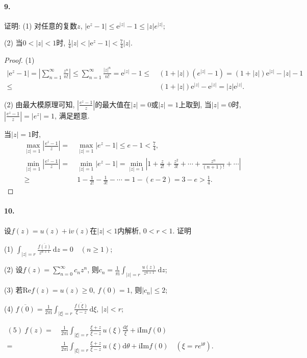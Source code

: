 \documentclass[12pt, a4paper, oneside]{ctexart}
\let\leq=\leqslant %
\let\geq=\geqslant %
\def\d{\mathrm{d}}      %
\def\e{\mathrm{e}}      %
\def\i{\mathrm{i}}      %
\def\ol{\overline}      %
\def\add{\vspace{1ex}}  %
\def\del{\vspace{-3.5ex}}  %
\begin{document}
\paragraph{9.}证明: (1) 对任意的复数$z$, $|\e^z-1|\leq \e^{|z|}-1\leq |z|e^{|z|};$\add

(2) 当$0<|z|<1$时, $\frac{1}{4}|z|<|\e^z-1|<\frac{7}{4}|z|.$
\begin{proof}
    (1)\del
    \begin{align*}
        |\e^z-1| = \left|\sum_{n=1}^\infty\frac{z^n}{n!}\right|\leq \sum_{n=1}^\infty\frac{|z|^n}{n!} = \e^{|z|}-1\leq&\ (1+|z|)(e^{|z|}-1) = (1+|z|)\e^{|z|}-|z|-1\\
        \leq&\ (1+|z|)\e^{|z|}-\e^{|z|}=|z|\e^{|z|}.
    \end{align*}
    \del

    (2) 由最大模原理可知, $\left|\frac{e^z-1}{z}\right|$的最大值在$|z| = 0$或$|z|=1$上取到, 当$|z|=0$时, $\left|\frac{e^z-1}{z}\right| = |e^z| = 1$, 满足题意.\add

    当$|z| = 1$时, 
    \begin{align*}
        \max_{|z| = 1}\left|\frac{e^z-1}{z}\right| =&\ \max_{|z| = 1}|e^z-1| \leq e - 1 < \frac{7}{4}, \\
        \min_{|z| = 1}\left|\frac{e^z-1}{z}\right| =&\ \min_{|z| = 1}|e^z-1| = \min_{|z| = 1}\left|1+\frac{z}{2!}+\frac{z^2}{3!}+\cdots+\frac{z^n}{(n+1)!}+\cdots\right|\\
        \geq&\ 1-\frac{1}{2!}-\frac{1}{3!}-\cdots = 1-(e-2) = 3-e > \frac{1}{4}.
    \end{align*}
\end{proof}
\del

\paragraph{10.}设$f(z) = u(z)+\i v(z)$在$|z|<1$内解析, $0<r<1$. 证明\add

(1) $\int_{|z|=r}\frac{\ol{f(z)}}{z^{n+1}}\,\d z = 0\quad(n\geq 1)$;

(2) 设$f(z) = \sum_{n=0}^\infty c_nz^n$, 则$c_n=\frac{1}{\pi \i}\int_{|z|=r}\frac{u(z)}{z^{n+1}}\,\d z$;\add

(3) 若$\text{Re}f(z) = u(z)\geq 0,\ f(0)=1$, 则$|c_n|\leq 2$;\add

(4) $\ol{f(0)} = \frac{1}{2\pi \i}\int_{|\xi|=r}\frac{\ol{f(\xi)}}{\xi-z}\,\d\xi,\ |z| < r$;\add

$\begin{aligned}
    (5)\ f(z) =&\ \frac{1}{2\pi \i}\int_{|\xi| = r}\frac{\xi + z}{\xi - z}\,u(\xi)\frac{\d \xi}{\xi}+\i\text{Im}f(0)\\
    =&\ \frac{1}{2\pi \i}\int_{|\xi| = r}\frac{\xi + z}{\xi - z}\,u(\xi)\d\theta+\i\text{Im}f(0)\quad(\xi = re^{\i\theta}).
\end{aligned}$
\end{document}
